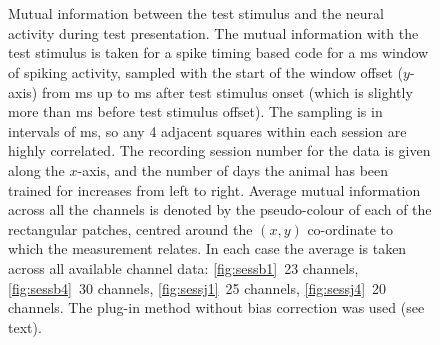 \begin{figure}[htbp]%
    \centering
    ~~
    \\
    ~~
    \caption{Mutual information between the test stimulus and the neural activity during test presentation.
The mutual information with the test stimulus is taken for a spike timing based code for a \unit[20]{ms} window of spiking activity, sampled with the start of the window offset ($y$-axis) from \unit[0]{ms} up to \unit[500]{ms} after test stimulus onset (which is slightly more than \unit[20]{ms} before test stimulus offset).
The sampling is in intervals of \unit[5]{ms}, so any 4 adjacent squares within each session are highly correlated.
The recording session number for the data is given along the $x$-axis, and the number of days the animal has been trained for increases from left to right.
Average mutual information across all the channels is denoted by the pseudo-colour of each of the rectangular patches, centred around the $(x,y)$ co-ordinate to which the measurement relates.
In each case the average is taken across all available channel data: \ref{fig:sessb1}~23 channels, \ref{fig:sessb4}~30 channels, \ref{fig:sessj1}~25 channels, \ref{fig:sessj4}~20 channels.
The plug-in method without bias correction was used (see text).
}
    \label{fig:sess}
\end{figure}



